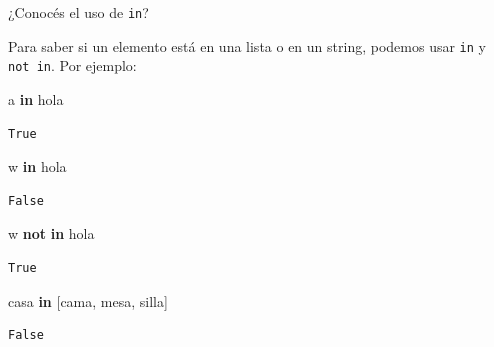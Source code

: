 \documentclass[
  letterpaper,
  DIV=11,
  numbers=noendperiod]{scrreprt}
\newenvironment{Shaded}{\begin{snugshade}}{\end{snugshade}}
\newcommand{\CommentTok}[1]{\textcolor[rgb]{0.37,0.37,0.37}{#1}}
\newcommand{\KeywordTok}[1]{\textcolor[rgb]{0.00,0.23,0.31}{\textbf{#1}}}
\newcommand{\NormalTok}[1]{\textcolor[rgb]{0.00,0.23,0.31}{#1}}
\newcommand{\StringTok}[1]{\textcolor[rgb]{0.13,0.47,0.30}{#1}}
\begin{document}
\begin{tcolorbox}[enhanced jigsaw, arc=.35mm, toptitle=1mm, colframe=quarto-callout-tip-color-frame, bottomtitle=1mm, opacitybacktitle=0.6, colbacktitle=quarto-callout-tip-color!10!white, leftrule=.75mm, coltitle=black, toprule=.15mm, titlerule=0mm, title=\textcolor{quarto-callout-tip-color}{\faLightbulb}\hspace{0.5em}{Tip: \texttt{in} y \texttt{not\ in}}, bottomrule=.15mm, rightrule=.15mm, colback=white, breakable, opacityback=0, left=2mm]

¿Conocés el uso de \texttt{in}?

Para saber si un elemento está en una lista o en un string, podemos usar
\texttt{in} y \texttt{not\ in}. Por ejemplo:

\begin{Shaded}
\begin{Highlighting}[]
\CommentTok{\textquotesingle{}a\textquotesingle{}} \KeywordTok{in} \StringTok{\textquotesingle{}hola\textquotesingle{}}
\end{Highlighting}
\end{Shaded}

\begin{verbatim}
True
\end{verbatim}

\begin{Shaded}
\begin{Highlighting}[]
\CommentTok{\textquotesingle{}w\textquotesingle{}} \KeywordTok{in} \StringTok{\textquotesingle{}hola\textquotesingle{}}
\end{Highlighting}
\end{Shaded}

\begin{verbatim}
False
\end{verbatim}

\begin{Shaded}
\begin{Highlighting}[]
\CommentTok{\textquotesingle{}w\textquotesingle{}} \KeywordTok{not} \KeywordTok{in} \StringTok{\textquotesingle{}hola\textquotesingle{}}
\end{Highlighting}
\end{Shaded}

\begin{verbatim}
True
\end{verbatim}

\begin{Shaded}
\begin{Highlighting}[]
\CommentTok{\textquotesingle{}casa\textquotesingle{}} \KeywordTok{in}\NormalTok{ [}\StringTok{\textquotesingle{}cama\textquotesingle{}}\NormalTok{, }\StringTok{\textquotesingle{}mesa\textquotesingle{}}\NormalTok{, }\StringTok{\textquotesingle{}silla\textquotesingle{}}\NormalTok{]}
\end{Highlighting}
\end{Shaded}

\begin{verbatim}
False
\end{verbatim}

\end{tcolorbox}
\end{document}
